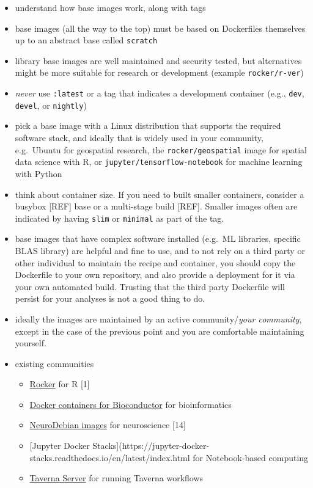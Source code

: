 \documentclass[10pt,letterpaper]{article}
\providecommand{\tightlist}{%
  \setlength{\itemsep}{0pt}\setlength{\parskip}{0pt}}
\begin{document}
\begin{itemize}
\tightlist
\item
  understand how base images work, along with tags
\item
  base images (all the way to the top) must be based on Dockerfiles
  themselves up to an abstract base called \texttt{scratch}
\item
  library base images are well maintained and security tested, but
  alternatives might be more suitable for research or development
  (example \texttt{rocker/r-ver})
\item
  \emph{never} use \texttt{:latest} or a tag that indicates a
  development container (e.g., \texttt{dev}, \texttt{devel}, or
  \texttt{nightly})
\item
  pick a base image with a Linux distribution that supports the required
  software stack, and ideally that is widely used in your community,
  e.g.~Ubuntu for geospatial research, the \texttt{rocker/geospatial}
  image for spatial data science with R, or
  \texttt{jupyter/tensorflow-notebook} for machine learning with Python
\item
  think about container size. If you need to built smaller containers,
  consider a busybox {[}REF{]} base or a multi-stage build {[}REF{]}.
  Smaller images often are indicated by having \texttt{slim} or
  \texttt{minimal} as part of the tag.
\item
  base images that have complex software installed (e.g.~ML libraries,
  specific BLAS library) are helpful and fine to use, and to not rely on
  a third party or other individual to maintain the recipe and
  container, you should copy the Dockerfile to your own repository, and
  also provide a deployment for it via your own automated build.
  Trusting that the third party Dockerfile will persist for your
  analyses is not a good thing to do.
\item
  ideally the images are maintained by an active community/\emph{your
  community}, except in the case of the previous point and you are
  comfortable maintaining yourself.
\item
  existing communities

  \begin{itemize}
  \tightlist
  \item
    \href{https://www.rocker-project.org/}{Rocker} for R {[}1{]}
  \item
    \href{https://bioconductor.org/help/docker/}{Docker containers for
    Bioconductor} for bioinformatics
  \item
    \href{https://hub.docker.com/_/neurodebian}{NeuroDebian images} for
    neuroscience {[}14{]}
  \item
    {[}Jupyter Docker
    Stacks{]}(https://jupyter-docker-stacks.readthedocs.io/en/latest/index.html
    for Notebook-based computing
  \item
    \href{https://hub.docker.com/r/taverna/taverna-server}{Taverna
    Server} for running Taverna workflows
  \end{itemize}
\end{itemize}
\end{document}
